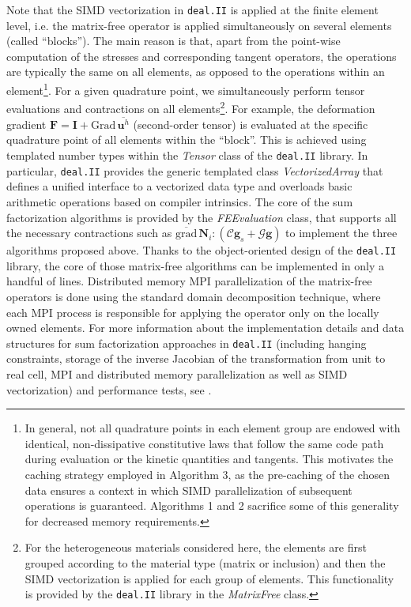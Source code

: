 \documentclass[AMA,STIX1COL]{WileyNJD-v2}
\newcommand*{\gz}[1]{\boldsymbol{#1}}
\newcommand*{\Grad}{\mathrm{Grad}}
\newcommand*{\grad}{\mathrm{grad}}
\begin{document}
Note that the SIMD vectorization
in \texttt{deal.II} \cite{dealII91}
is applied at the finite element level, i.e. the matrix-free operator is applied simultaneously on several elements (called ``blocks'').
The main reason is that, apart from the point-wise computation of the stresses and corresponding tangent operators, the operations are typically the same on all elements,
as opposed to the operations within an element\footnote{%
In general, not all quadrature points in each element group are endowed with identical, non-dissipative constitutive laws that
follow the same code path during evaluation or the kinetic quantities and tangents.
This motivates the caching strategy employed in Algorithm 3, as the pre-caching of the chosen data ensures a context in which
SIMD parallelization of subsequent operations is guaranteed.
Algorithms 1 and 2 sacrifice some of this generality for decreased memory requirements.
}.
For a given quadrature point, we simultaneously perform tensor evaluations and contractions on all elements\footnote{%
For the heterogeneous materials considered here,
the elements are first grouped according to the material type (matrix or inclusion) and then the SIMD vectorization is applied for each group of elements.
This functionality is provided by the \texttt{deal.II} library in the \textit{MatrixFree} class.
}.
For example, the deformation gradient $\gz F = \gz I + \Grad \, \overline{\gz u^h}$ (second-order tensor) is evaluated at the specific quadrature point of all elements within the ``block''.
This is achieved using templated number types within the \textit{Tensor} class of the \texttt{deal.II} library.
In particular, \texttt{deal.II} provides the generic templated class \textit{VectorizedArray} that defines a unified interface to a vectorized data type
and overloads basic arithmetic operations based on compiler intrinsics.
The core of the sum factorization algorithms is provided by the
\textit{FEEvaluation} class, that supports all the necessary contractions such as $\overline{\grad} \, \gz N_i : (\boldsymbol{\mathcal{C}}\gz g_s  + \boldsymbol{\mathcal{G}} \gz g)$ to implement the three algorithms proposed above.
Thanks to the object-oriented design of the \texttt{deal.II} library, the core of those matrix-free algorithms can be implemented in only a handful of lines.
Distributed memory MPI parallelization of the matrix-free operators is done using the standard domain decomposition technique,
where each MPI process is responsible for applying the operator only on the locally owned elements.
For more information about the implementation details and data structures for sum factorization approaches in \texttt{deal.II}
(including hanging constraints, storage of the inverse Jacobian of the transformation from unit to real cell, MPI and distributed memory parallelization as well as SIMD vectorization) and performance tests, see \cite{kronbichler12}.
\end{document}
